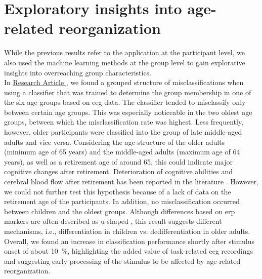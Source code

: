 \section{Exploratory insights into age-related reorganization}
While the previous results refer to the application at the participant level, we also used the machine learning methods at the group level to gain explorative insights into overreaching group characteristics.\\
In \hyperref[results:paperII]{Research Article }, we found a grouped structure of misclassifications when using a classifier that was trained to determine the group membership in one of the six age groups based on \gls{eeg} data. The classifier tended to misclassify only between certain age groups. This was especially noticeable in the two oldest age groups, between which the misclassification rate was highest. Less frequently, however, older participants were classified into the group of late middle-aged adults and vice versa. Considering the age structure of the older adults (minimum age of 65 years) and the middle-aged adults (maximum age of 64 years), as well as a retirement age of around 65, this could indicate major cognitive changes after retirement. Deterioration of cognitive abilities and cerebral blood flow after retirement has been reported in the literature \cite{Celidoni2017, Rohwedder2010, Rogers1990}. However, we could not further test this hypothesis because of a lack of data on the retirement age of the participants. In addition, no misclassification occurred between children and the oldest groups. Although differences based on \gls{erp} markers are often described as u-shaped \cite{Mueller2008, Reuter2019}, this result suggests different mechanisms, i.e., differentiation in children vs. dedifferentiation in older adults. Overall, we found an increase in classification performance shortly after stimulus onset of about 10~\%, highlighting the added value of task-related \gls{eeg} recordings and suggesting early processing of the stimulus to be affected by age-related reorganization.\\
